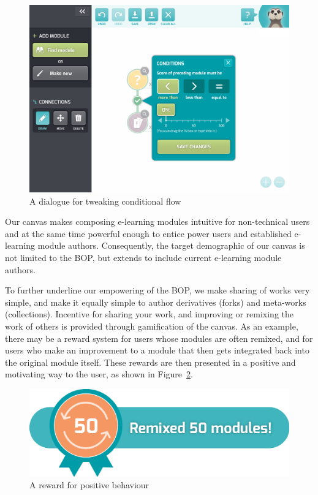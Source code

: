 \begin{figure}[H]
    \centering
    \begin{scale}{0.1}
        \includegraphics{fig/conditions.png}
    \end{scale}
    \caption{A dialogue for tweaking conditional flow}
\label{fig:conditions}
\end{figure}

Our canvas makes composing e-learning modules intuitive for non-technical 
users and at the same time powerful enough to entice power users and 
established e-learning module authors. Consequently, the target demographic of 
our canvas is not limited to the BOP, but extends to include current 
e-learning module authors.

To further underline our empowering of the BOP, we make sharing of works very 
simple, and make it equally simple to author derivatives (forks) and 
meta-works (collections). Incentive for sharing your work, and improving or 
remixing the work of others is provided through gamification of the canvas. As 
an example, there may be a reward system for users whose modules are often 
remixed, and for users who make an improvement to a module that then gets 
integrated back into the original module itself. These rewards are then 
presented in a positive and motivating way to the user, as shown in 
Figure~\ref{fig:rewards}.

\begin{figure}[H]
    \centering
    \begin{scale}{0.1}
        \includegraphics{fig/rewards.png}
    \end{scale}
    \caption{A reward for positive behaviour}
\label{fig:rewards}
\end{figure}

